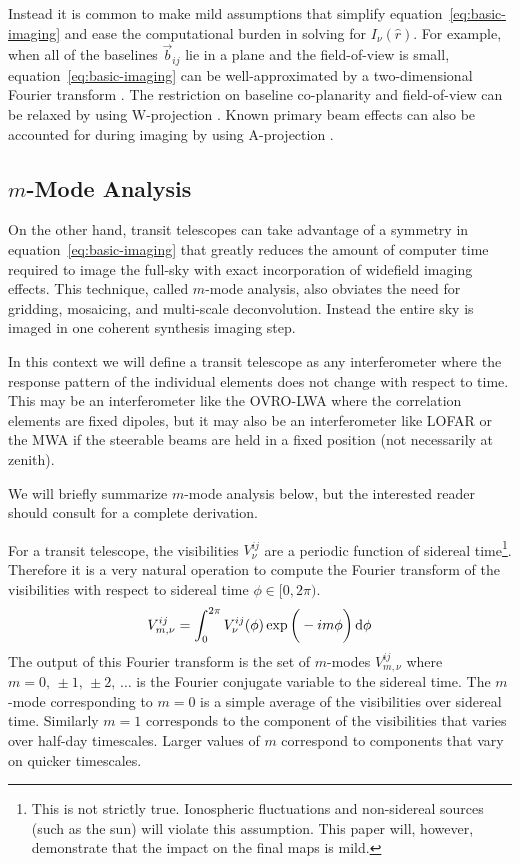 \documentclass[twocolumn]{aastex6}
\renewcommand{\d}{{\rm d}}
\begin{document}
Instead it is common to make mild assumptions that simplify equation~\ref{eq:basic-imaging} and ease
the computational burden in solving for $I_\nu(\hat r)$. For example, when all of the baselines
$\vec b_{ij}$ lie in a plane and the field-of-view is small, equation~\ref{eq:basic-imaging} can be
well-approximated by a two-dimensional Fourier transform \citep{2001isra.book.....T}. The
restriction on baseline co-planarity and field-of-view can be relaxed by using W-projection
\citep{2008ISTSP...2..647C}. Known primary beam effects can also be accounted for during imaging by
using A-projection \citep{2013ApJ...770...91B}.

\subsection{$m$-Mode Analysis}

On the other hand, transit telescopes can take advantage of a symmetry in
equation~\ref{eq:basic-imaging} that greatly reduces the amount of computer time required to image
the full-sky with exact incorporation of widefield imaging effects. This technique, called $m$-mode
analysis, also obviates the need for gridding, mosaicing, and multi-scale deconvolution. Instead the
entire sky is imaged in one coherent synthesis imaging step.

In this context we will define a transit telescope as any interferometer where the response pattern
of the individual elements does not change with respect to time. This may be an interferometer like
the OVRO-LWA where the correlation elements are fixed dipoles, but it may also be an interferometer
like LOFAR or the MWA if the steerable beams are held in a fixed position (not necessarily at
zenith).

We will briefly summarize $m$-mode analysis below, but the interested reader should consult
\citet{2014ApJ...781...57S, 2015PhRvD..91h3514S} for a complete derivation.

For a transit telescope, the visibilities $V^{ij}_\nu$ are a periodic function of sidereal
time\footnote{
    This is not strictly true. Ionospheric fluctuations and non-sidereal sources (such as the sun)
    will violate this assumption. This paper will, however, demonstrate that the impact on the final
    maps is mild.
}.
Therefore it is a very natural operation to compute the Fourier transform of the visibilities with
respect to sidereal time $\phi\in[0,2\pi)$.
\begin{equation}
    V^{ij}_{m,\nu} = \int_0^{2\pi} V^{ij}_\nu(\phi)\exp\bigg(-im\phi\bigg)\,\d\phi
\end{equation}
The output of this Fourier transform is the set of $m$-modes $V^{ij}_{m,\nu}$ where
$m=0,\,\pm1,\,\pm2,\,\ldots$ is the Fourier conjugate variable to the sidereal time. The $m$-mode
corresponding to $m=0$ is a simple average of the visibilities over sidereal time. Similarly $m=1$
corresponds to the component of the visibilities that varies over half-day timescales. Larger values
of $m$ correspond to components that vary on quicker timescales.
\end{document}
